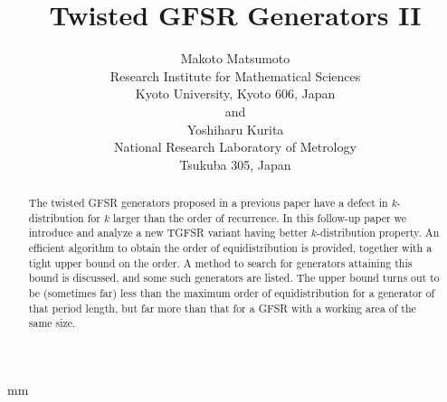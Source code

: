 ﻿    %

\textheight 245mm
\textwidth 172mm
 mm
\topmargin -25mm

\title{Twisted GFSR Generators II
}

\author{Makoto Matsumoto
	\\ Research Institute for Mathematical Sciences
	\\ Kyoto University, Kyoto 606, Japan
	\\ and
	\\ Yoshiharu Kurita
	\\ National Research Laboratory of Metrology
	\\ Tsukuba 305, Japan}    %

\def\thefootnote{\fnsymbol{footnote}}
\def\bx{{\bf x}}
\def\by{{\bf y}}
\def\bz{{\bf z}}
\def\bu{{\bf u}}

\def\bi{{\bf i}}
\def\ba{{\bf a}}
\def\bb{{\bf b}}
\def\bc{{\bf c}}
\def\bd{{\bf d}}
\def\be{{\bf e}}
\def\bp{{\bf p}}
\def\calx{{\cal X}}
\def\mod{{\mbox{ mod }}}
\def\appro{\mbox{trunc}}

\def\notdivide{{\hspace{1.5pt}| \hspace{-4.65pt} /}}  %

\maketitle                 %
\def\N{{\rm I\kern-0.2em N}}  %
\def\rmI{{\rm I}}

\begin{abstract}
The twisted GFSR generators proposed in a previous paper
have a defect in $k$-distribution for $k$ larger than
the order of recurrence.
In this follow-up paper
we introduce and analyze a new TGFSR variant
having better $k$-distribution property.
An efficient algorithm to obtain
the order of equidistribution is provided,
together with a tight upper bound on the order.
A method to search for generators attaining this bound
is discussed, and some such generators are listed.
The upper bound turns out to be (sometimes far) 
less than the maximum order of equidistribution
for a generator of that period length,
but far more than that for a GFSR with a working area of 
the same size.

\end{abstract}

